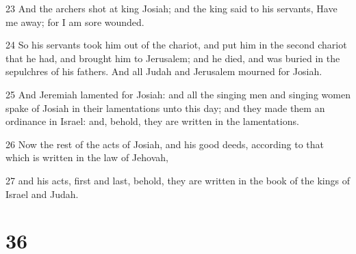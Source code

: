 \par 23 And the archers shot at king Josiah; and the king said to his servants, Have me away; for I am sore wounded.
\par 24 So his servants took him out of the chariot, and put him in the second chariot that he had, and brought him to Jerusalem; and he died, and was buried in the sepulchres of his fathers. And all Judah and Jerusalem mourned for Josiah.
\par 25 And Jeremiah lamented for Josiah: and all the singing men and singing women spake of Josiah in their lamentations unto this day; and they made them an ordinance in Israel: and, behold, they are written in the lamentations.
\par 26 Now the rest of the acts of Josiah, and his good deeds, according to that which is written in the law of Jehovah,
\par 27 and his acts, first and last, behold, they are written in the book of the kings of Israel and Judah.

\chapter{36}


